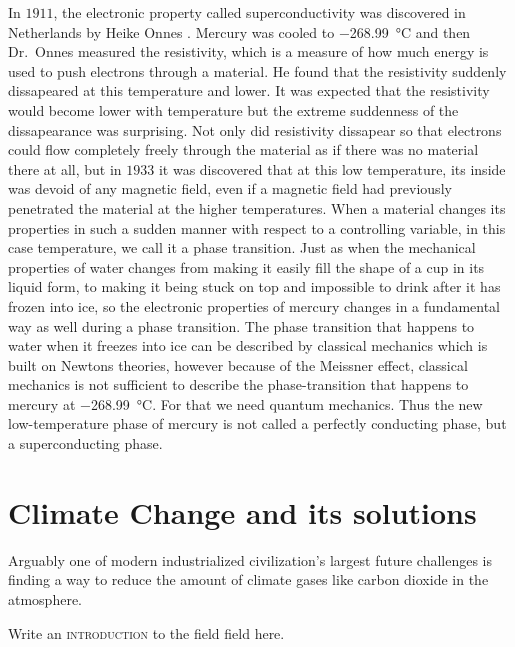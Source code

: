 In $1911$, the electronic property called superconductivity was discovered in Netherlands by Heike Onnes \cite{Onnes}. Mercury
was cooled to \SI{-268.99}{\degreeCelsius} and then Dr.~Onnes measured the resistivity, which is a measure of how much energy
is used to push electrons through a material. He found that the resistivity suddenly dissapeared at this temperature and lower.
It was expected that the resistivity would become lower with temperature but the extreme suddenness of the dissapearance was
surprising. Not only did resistivity dissapear so that electrons could flow completely freely through the material as if there
was no material there at all, but in $1933$ it was discovered that at this low temperature, its inside was devoid of any
magnetic field, even if a magnetic field had previously penetrated the material at the higher temperatures. When a material
changes its properties in such a sudden manner with respect to a controlling variable, in this case temperature, we call it
a phase transition. Just as when the mechanical properties of water changes from making it easily fill the shape of a cup
in its liquid form, to making it being stuck on top and impossible to drink after it has frozen into
ice, so the electronic properties of mercury changes in a fundamental way as well during a phase transition. The phase
transition that happens to water when it freezes into ice can be described by classical mechanics which is built on Newtons
theories, however because of the Meissner effect, classical mechanics is not sufficient to describe the phase-transition that
happens to mercury at \SI{-268.99}{\degreeCelsius}. For that we need quantum mechanics. Thus the new low-temperature phase
of mercury is not called a perfectly conducting phase, but a superconducting phase.

\section{Climate Change and its solutions}

Arguably one of modern industrialized civilization's largest future challenges is finding a way to reduce the amount of
climate gases like carbon dioxide in the atmosphere. 

Write an \textsc{introduction} to the field {\prefixFont field} here. 
